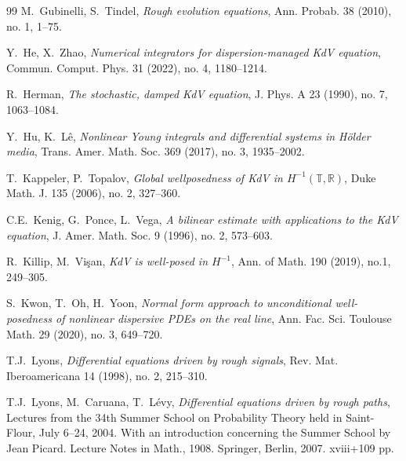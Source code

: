 \documentclass[letterpaper, 11pt,  reqno]{amsart}
\newcommand{\1}{\hspace{0.5mm}\textup{I}\hspace{0.5mm}}
\newcommand{\R}{\mathbb{R}}
\newcommand{\T}{\mathbb{T}}
\numberwithin{equation}{section}
\numberwithin{theorem}{section}
\begin{document}
\begin{thebibliography}{99}
M.~Gubinelli, S.~Tindel,
{\it Rough evolution equations},
Ann. Probab. 38 (2010), no. 1, 1--75.



Y.~He, X.~Zhao,
{\it Numerical integrators for dispersion-managed KdV equation}, 
Commun. Comput. Phys. 31 (2022), no. 4, 1180--1214. 


R.~Herman, 
{\it The stochastic, damped KdV equation}, J. Phys. A 23 (1990), no. 7, 1063--1084.


Y.~Hu, K.~L\^e, 
{\it Nonlinear Young integrals and differential systems in H\"older media},
 Trans. Amer. Math. Soc. 369 (2017), no. 3, 1935--2002. 







T.~Kappeler, P.~Topalov,
{\it Global wellposedness of KdV in $H^{-1}(\T, \R)$},
Duke Math. J. 135 (2006), no. 2, 327--360.





C.E.~Kenig, G.~Ponce, L.~Vega,
{\it A bilinear estimate with applications to the KdV equation},
J. Amer. Math. Soc. 9 (1996), no. 2, 573--603.





R.~Killip, M.~Vi\c{s}an, 
{\it KdV is well-posed in $H^{-1}$}, 
Ann. of Math. 190 (2019), no.1, 249--305.




S.~Kwon, T.~Oh, H.~Yoon, 
{\it Normal form approach to unconditional well-posedness of nonlinear dispersive PDEs on the real line}, Ann. Fac. Sci. Toulouse Math. 29 (2020), no. 3, 649--720. 





T.J.~Lyons,
{\it Differential equations driven by rough signals},
Rev. Mat. Iberoamericana 14 (1998), no. 2, 215--310.




T.J.~Lyons, M.~Caruana, T.~L{\'e}vy,
{\it Differential equations driven by rough paths},
Lectures from the 34th Summer School on Probability Theory held in Saint-Flour, 
July 6--24, 2004. 
With an introduction concerning the Summer School by Jean Picard.
Lecture Notes in Math., 1908.
 Springer, Berlin, 2007. xviii+109 pp.


%
%
%










\end{thebibliography}
\end{document}
